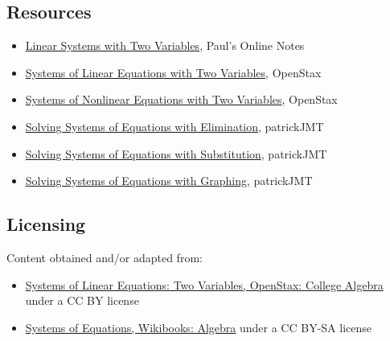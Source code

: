 \subsection{Resources}
\label{sss:reso-55b5}




\begin{itemize}
    \item \href{https://tutorial.math.lamar.edu/classes/alg/systemstwovrble.aspx}{Linear Systems with Two Variables}, Paul's Online Notes
    \item \href{https://openstax.org/books/college-algebra/pages/7-1-systems-of-linear-equations-two-variables}{Systems of Linear Equations with Two Variables}, OpenStax
    \item \href{https://openstax.org/books/college-algebra/pages/7-3-systems-of-nonlinear-equations-and-inequalities-two-variables}{Systems of Nonlinear Equations with Two Variables}, OpenStax
    \item \href{https://www.youtube.com/watch?v=ej25myhYcSg}{Solving Systems of Equations with Elimination}, patrickJMT
    \item \href{https://www.youtube.com/watch?v=cwHR_B9zK7k}{Solving Systems of Equations with Substitution}, patrickJMT
    \item \href{https://www.youtube.com/watch?v=WNkPKv0OTGI}{Solving Systems of Equations with Graphing}, patrickJMT
\end{itemize}


\subsection{Licensing}
\label{sss:lice-7352}




Content obtained and/or adapted from:



\begin{itemize}
    \item \href{https://openstax.org/books/college-algebra/pages/7-1-systems-of-linear-equations-two-variables}{Systems of Linear Equations: Two Variables, OpenStax: College Algebra} under a CC BY license
    \item \href{https://en.wikibooks.org/wiki/Algebra/Systems_of_Equations}{Systems of Equations, Wikibooks: Algebra} under a CC BY-SA license
\end{itemize}


